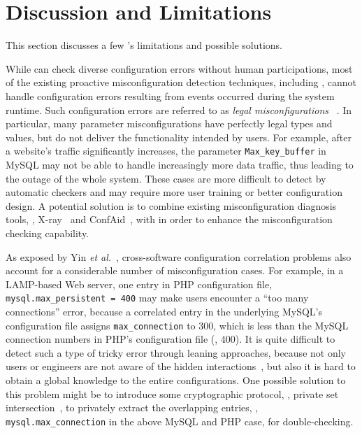 
\section{Discussion and Limitations}

This section discusses a few \app's limitations
and possible solutions.

While \app can check diverse configuration errors without
human participations, most of the existing proactive 
misconfiguration detection techniques,
including \app, cannot handle configuration errors
resulting from events occurred during the system runtime.
Such configuration errors are referred to as {\em legal misconfigurations}%
~\cite{yin11anempirical}. In particular, 
many parameter misconfigurations have 
perfectly legal types and values, 
but do not deliver the functionality intended by users. 
For example, after a website's traffic significantly increases,
the parameter {\tt Max\_key\_buffer} in MySQL may not 
be able to handle increasingly more data traffic,
thus leading to the outage of the whole system.
These cases are more difficult to detect by
automatic checkers and may require more user training or
better configuration design.
A potential solution is to combine existing misconfiguration diagnosis
tools, \eg, X-ray~\cite{attariyan12x-ray} 
and ConfAid~\cite{attariyan10automating},
with \app in order to enhance the 
misconfiguration checking capability.

As exposed by Yin {\em et al.}~\cite{yin11anempirical},
cross-software configuration correlation problems also account
for a considerable number of misconfiguration cases.
For example, in a LAMP-based Web server, one entry in 
PHP configuration file, {\tt mysql.max\_persistent = 400}
may make users encounter a ``too many connections'' error,
because a correlated entry in the underlying MySQL's configuration
file assigns {\tt max\_connection} to 300, which is less
than the MySQL connection numbers in PHP's configuration file (\ie, 400).
It is quite difficult to detect such a type of tricky error
through leaning approaches, because not only users or engineers 
are not aware of the hidden interactions~\cite{xu15systems},
but also it is hard to obtain a global knowledge to the entire
configurations.
One possible solution to this problem might be to introduce
some cryptographic protocol, \eg, private set
intersection~\cite{kissner05privacy}, to privately extract the
overlapping entries, \eg, {\tt mysql.max\_connection} in the 
above MySQL and PHP case, for double-checking.


